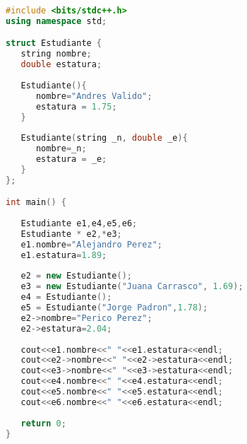 \begin{lstlisting}[language=C++]
#include <bits/stdc++.h>
using namespace std;

struct Estudiante {
   string nombre;
   double estatura;
	
   Estudiante(){
      nombre="Andres Valido";
      estatura = 1.75;
   }
	
   Estudiante(string _n, double _e){
      nombre=_n;
      estatura = _e;
   }
};

int main() {
	
   Estudiante e1,e4,e5,e6;
   Estudiante * e2,*e3;
   e1.nombre="Alejandro Perez";
   e1.estatura=1.89;
	
   e2 = new Estudiante();
   e3 = new Estudiante("Juana Carrasco", 1.69);
   e4 = Estudiante();
   e5 = Estudiante("Jorge Padron",1.78);
   e2->nombre="Perico Perez";
   e2->estatura=2.04;
	
   cout<<e1.nombre<<" "<<e1.estatura<<endl;
   cout<<e2->nombre<<" "<<e2->estatura<<endl;
   cout<<e3->nombre<<" "<<e3->estatura<<endl;
   cout<<e4.nombre<<" "<<e4.estatura<<endl;
   cout<<e5.nombre<<" "<<e5.estatura<<endl;
   cout<<e6.nombre<<" "<<e6.estatura<<endl;
	
   return 0;
}
\end{lstlisting}